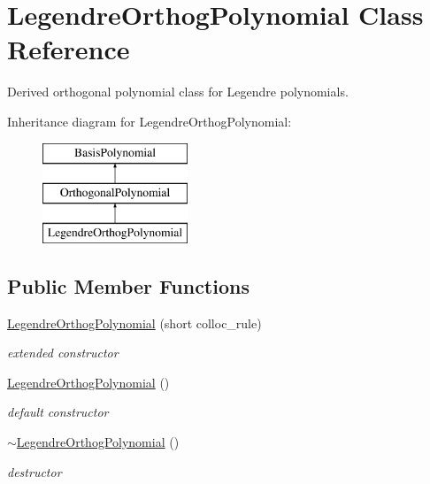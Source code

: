 \section{Legendre\+Orthog\+Polynomial Class Reference}
\label{classPecos_1_1LegendreOrthogPolynomial}


Derived orthogonal polynomial class for Legendre polynomials.  


Inheritance diagram for Legendre\+Orthog\+Polynomial\+:\begin{figure}[H]
\begin{center}
\leavevmode
\includegraphics[height=3.000000cm]{classPecos_1_1LegendreOrthogPolynomial}
\end{center}
\end{figure}
\subsection*{Public Member Functions}
\begin{DoxyCompactItemize}
\item 
\hyperlink{classPecos_1_1LegendreOrthogPolynomial_a4ae5004f677ec912e23e278bba014767}{Legendre\+Orthog\+Polynomial} (short colloc\+\_\+rule)\label{classPecos_1_1LegendreOrthogPolynomial_a4ae5004f677ec912e23e278bba014767}

\begin{DoxyCompactList}\small\item\em extended constructor \end{DoxyCompactList}\item 
\hyperlink{classPecos_1_1LegendreOrthogPolynomial_a00e945d1792f3427ef2dccaa9cbfb5af}{Legendre\+Orthog\+Polynomial} ()\label{classPecos_1_1LegendreOrthogPolynomial_a00e945d1792f3427ef2dccaa9cbfb5af}

\begin{DoxyCompactList}\small\item\em default constructor \end{DoxyCompactList}\item 
\hyperlink{classPecos_1_1LegendreOrthogPolynomial_a00265f037d9aaf3cf94a4942157220a5}{$\sim$\+Legendre\+Orthog\+Polynomial} ()\label{classPecos_1_1LegendreOrthogPolynomial_a00265f037d9aaf3cf94a4942157220a5}

\begin{DoxyCompactList}\small\item\em destructor \end{DoxyCompactList}\end{DoxyCompactItemize}
